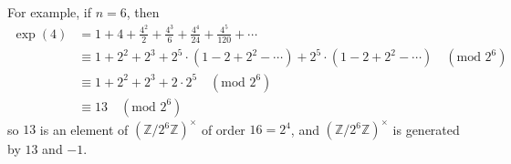 \documentclass{article}
\newcommand{\Mod}[1]{(\text{mod }#1)}
\begin{document}
For example, if $n = 6$, then 
\begin{align*}
\exp(4) &= 1 + 4 + \frac{4^{2}}{2} + \frac{4^{3}}{6} + \frac{4^{4}}{24} + \frac{4^{5}}{120} + \cdots \\
&\equiv 1 + 2^{2} + 2^{3} + 2^{5}\cdot (1-2 + 2^{2} - \cdots) +  2^{5}\cdot (1-2 + 2^{2} - \cdots) \quad\Mod{2^{6}} \\
&\equiv 1 + 2^{2} + 2^{3} + 2\cdot 2^{5} \quad\Mod{2^{6}} \\
&\equiv 13\quad\Mod{2^{6}}
\end{align*}
so $13$ is an element of $(\mathbb{Z}/2^{6}\mathbb{Z})^{\times}$ of order $16 = 2^{4}$, and $(\mathbb{Z}/2^{6}\mathbb{Z})^{\times}$ is generated by $13$ and $-1$. 
\begin{comment}
We can actually compute this with SAGE. Exponential function is already implemented in SAGE, so we made a simple code for the Teichm\"uller character. 
\end{comment}
\end{document}
